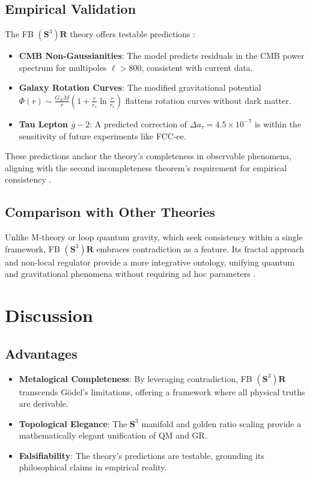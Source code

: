 \documentclass[a4paper,12pt]{article}
\begin{document}
\subsection{Empirical Validation}
The FB $\left(\mathbf{S}^3\right)\mathbf{R}$ theory offers testable predictions \cite{Preece2025b}:
\begin{itemize}
    \item \textbf{CMB Non-Gaussianities}: The model predicts residuals in the CMB power spectrum for multipoles $\ell > 800$, consistent with current data.
    \item \textbf{Galaxy Rotation Curves}: The modified gravitational potential $\Phi(r) \sim \frac{G_N M}{r} \left(1 + \frac{r}{r_c} \ln \frac{r}{r_c}\right)$ flattens rotation curves without dark matter.
    \item \textbf{Tau Lepton $g-2$}: A predicted correction of $\Delta a_\tau = 4.5 \times 10^{-7}$ is within the sensitivity of future experiments like FCC-ee.
\end{itemize}
These predictions anchor the theory's completeness in observable phenomena, aligning with the second incompleteness theorem's requirement for empirical consistency \cite{Preece2025a}.

\subsection{Comparison with Other Theories}
Unlike M-theory or loop quantum gravity, which seek consistency within a single framework, FB $\left(\mathbf{S}^3\right)\mathbf{R}$ embraces contradiction as a feature. Its fractal approach and non-local regulator provide a more integrative ontology, unifying quantum and gravitational phenomena without requiring ad hoc parameters \cite{Preece2025a,Preece2025b}.

\section{Discussion}

\subsection{Advantages}
\begin{itemize}
    \item \textbf{Metalogical Completeness}: By leveraging contradiction, FB $\left(\mathbf{S}^3\right)\mathbf{R}$ transcends Gödel's limitations, offering a framework where all physical truths are derivable.
    \item \textbf{Topological Elegance}: The $\mathbf{S}^3$ manifold and golden ratio scaling provide a mathematically elegant unification of QM and GR.
    \item \textbf{Falsifiability}: The theory's predictions are testable, grounding its philosophical claims in empirical reality.
\end{itemize}
\end{document}
